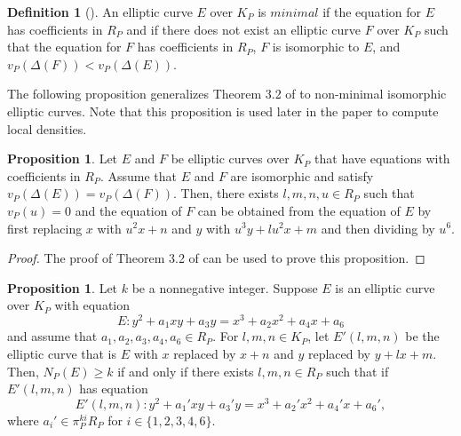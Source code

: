 \documentclass[12pt,letterpaper]{amsart}
\theoremstyle{definition}
\newtheorem{proposition}[theorem]{Proposition}
\newtheorem{definition}[theorem]{Definition}
\begin{document}
\begin{definition}[\cite{TateAlgorithm}] 
An elliptic curve $E$ over $K_P$ is $\textit{minimal}$ if the equation for $E$ has coefficients in $R_P$ and if there does not exist an elliptic curve $F$ over $K_P$ such that the equation for $F$ has coefficients in $R_P$, $F$ is isomorphic to $E$, and $v_P(\Delta(F))< v_P(\Delta(E))$.
\end{definition}

The following proposition generalizes Theorem 3.2 of \cite{TateAlgorithm} to non-minimal isomorphic elliptic curves. Note that this proposition is used later in the paper to compute local densities.

\begin{proposition}
\label{translation}
Let $E$ and $F$ be elliptic curves over $K_P$ that have equations with coefficients in $R_P$. Assume that $E$ and $F$ are isomorphic and satisfy $v_P(\Delta(E))=v_P(\Delta(F))$. Then, there exists $l,m,n,u\in R_P$ such that $v_P(u)=0$ and the equation of $F$ can be obtained from the equation of $E$ by first replacing $x$ with $u^2x+n$ and $y$ with $u^3y+lu^2x+m$ and then dividing by $u^6$.
\end{proposition}
\begin{proof}
The proof of Theorem 3.2 of \cite{TateAlgorithm} can be used to prove this proposition.
\end{proof}

\begin{proposition}
\label{prop:multiterations}
     Let $k$ be a nonnegative integer. Suppose $E$ is an elliptic curve over $K_P$ with equation
     \[
     E: y^2+a_1xy+a_3y=x^3+a_2x^2+a_4x+a_6
     \]
     and assume that $a_1,a_2,a_3,a_4,a_6\in R_P$. For $l,m,n\in K_P$, let $E'(l,m,n)$ be the elliptic curve that is $E$ with $x$ replaced by $x+n$ and $y$ replaced by $y+lx+m$. Then, $N_P(E)\geq k$ if and only if there exists $l,m,n\in R_P$ such that if $E'(l,m,n)$ has equation
     \[
     E'(l,m,n):y^2+a_1'xy+a_3'y=x^3+a_2'x^2+a_4'x+a_6',
     \]
     where $a_i'\in \pi_P^{ki}R_P$ for $i\in\{1,2,3,4,6\}$.
\end{proposition}
\end{document}
